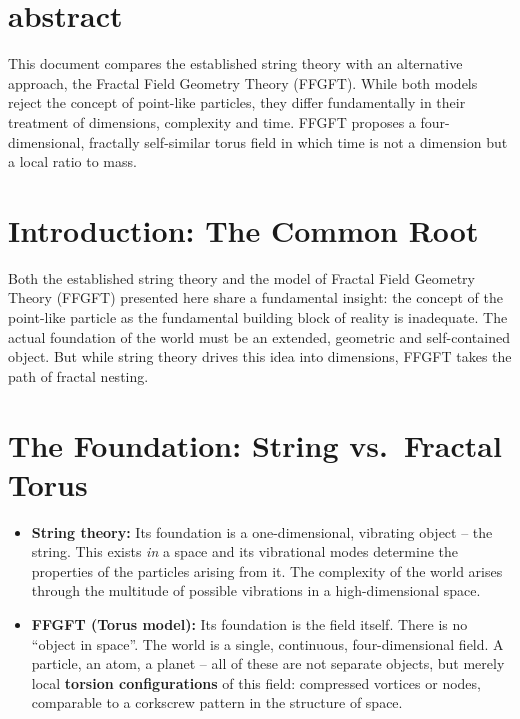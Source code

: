 
	
	\section{abstract}
		This document compares the established string theory with an alternative approach, the Fractal Field Geometry Theory (FFGFT). While both models reject the concept of point-like particles, they differ fundamentally in their treatment of dimensions, complexity and time. FFGFT proposes a four-dimensional, fractally self-similar torus field in which time is not a dimension but a local ratio to mass.

	
	\section*{Introduction: The Common Root}
	
	Both the established string theory and the model of Fractal Field Geometry Theory (FFGFT) presented here share a fundamental insight: the concept of the point-like particle as the fundamental building block of reality is inadequate. The actual foundation of the world must be an extended, geometric and self-contained object. But while string theory drives this idea into dimensions, FFGFT takes the path of fractal nesting.
	
	\section{The Foundation: String vs.\ Fractal Torus}
	
	\begin{itemize}
		\item \textbf{String theory:} Its foundation is a one-dimensional, vibrating object -- the string. This exists \textit{in} a space and its vibrational modes determine the properties of the particles arising from it. The complexity of the world arises through the multitude of possible vibrations in a high-dimensional space.
		
		\item \textbf{FFGFT (Torus model):} Its foundation is the field itself. There is no ``object in space''. The world is a single, continuous, four-dimensional field. A particle, an atom, a planet -- all of these are not separate objects, but merely local \textbf{torsion configurations} of this field: compressed vortices or nodes, comparable to a corkscrew pattern in the structure of space.
	\end{itemize}
	
